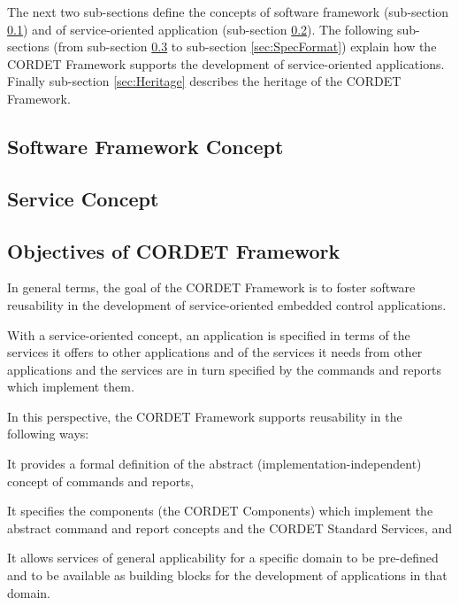 \documentclass[a4paper,10pt]{article}
\newenvironment{fw_enumerate}					%
{\begin{enumerate}
  \setlength{\itemsep}{1mm}
  \setlength{\parskip}{0pt}
  \setlength{\parsep}{0pt}}
{\end{enumerate}}
\begin{document}
The next two sub-sections define the concepts of software framework (sub-section \ref{sec:SwFwConcept}) and of service-oriented application (sub-section \ref{sec:ServConcept}). 
The following sub-sections (from sub-section \ref{sec:ObjectivesOfCrFw} to sub-section \ref{sec:SpecFormat}) explain how the CORDET Framework supports the development of service-oriented applications. 
Finally sub-section \ref{sec:Heritage} describes the heritage of the CORDET Framework.

\subsection{Software Framework Concept}\label{sec:SwFwConcept} 


\subsection{Service Concept}\label{sec:ServConcept} 

\subsection{Objectives of CORDET Framework}\label{sec:ObjectivesOfCrFw} 

In general terms, the goal of the CORDET Framework is to foster software reusability in the development of service-oriented embedded control applications. 

With a service-oriented concept, an application is specified in terms of the services it offers to other applications and of the services it needs from other applications and the services are in turn specified by the commands and reports which implement them.

In this perspective, the CORDET Framework supports reusability in the following ways:

\begin{fw_enumerate}
\item{} It provides a formal definition of the abstract (implementation-independent) concept of commands and reports,
\item{} It specifies the components (the CORDET Components) which implement the abstract command and report concepts and the CORDET Standard Services, and
\item{} It allows services of general applicability for a specific domain to be pre-defined and to be available as building blocks for the development of applications in that domain.
\end{fw_enumerate}
\end{document}
